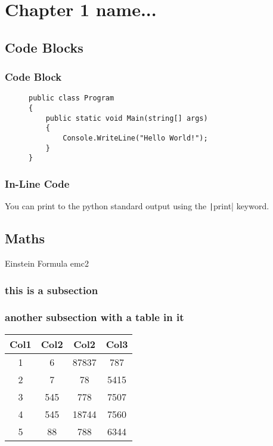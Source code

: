 \chapter{Chapter 1 name...}

\section{Code Blocks}

\subsection{Code Block}

\begin{figure}[H]
    \begin{verbatim}
public class Program
{
    public static void Main(string[] args)
    {
        Console.WriteLine("Hello World!");
    }
}
    \end{verbatim}
\end{figure}


\subsection{In-Line Code}

You can print to the python standard output using the \texttt|print| keyword. 

\newpage

\section{Maths}

{Einstein Formula}
{emc2}

\subsection{this is a subsection}

\lipsum[7-8]

\subsection{another subsection with a table in it}


\begin{table}[h!]
\centering
\begin{tabular}{||c|c|c|c||} 
 \hline
 Col1 & Col2 & Col2 & Col3 \\ [0.5ex] 
 \hline\hline
 1 & 6 & 87837 & 787 \\ 
 2 & 7 & 78 & 5415 \\
 3 & 545 & 778 & 7507 \\
 4 & 545 & 18744 & 7560 \\
 5 & 88 & 788 & 6344 \\ [1ex] 
 \hline
\end{tabular}
\end{table}

